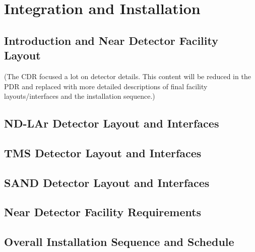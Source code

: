 \chapter{Integration and Installation}
\label{ch:int-inst}

\section{Introduction and Near Detector Facility Layout} 
\label{sec:int-inst-intro}

(The CDR focused a lot on detector details. This content will be reduced in the PDR and replaced with more detailed descriptions of final facility layouts/interfaces and the installation sequence.)

\section{ND-LAr Detector Layout and Interfaces}
\label{sec:int-inst-ndlar-layout}


\section{TMS Detector Layout and Interfaces}
\label{sec:int-inst-tms-layout}


\section{SAND Detector Layout and Interfaces}
\label{sec:int-inst-sand-layout}


\section{Near Detector Facility Requirements}
\label{sec:int-inst-fac-req}



\section{Overall Installation Sequence and Schedule}
\label{sec:int-inst-seq-sched}


